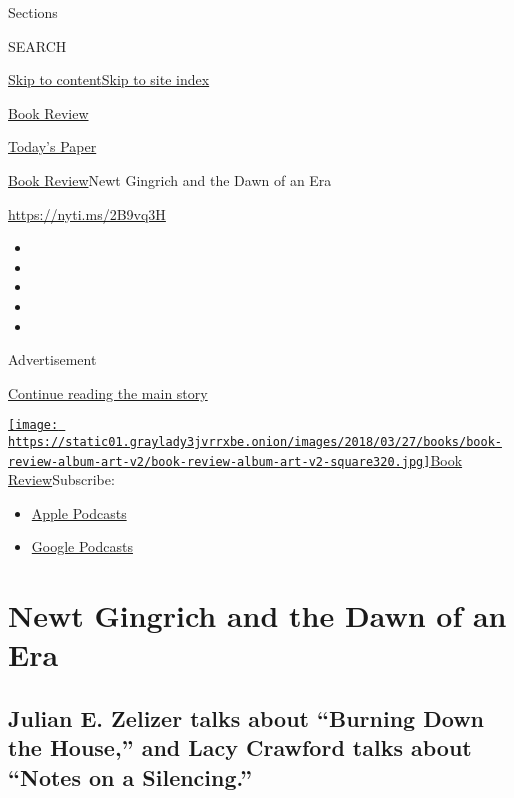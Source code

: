 Sections

SEARCH

\protect\hyperlink{site-content}{Skip to
content}\protect\hyperlink{site-index}{Skip to site index}

\href{https://www.nytimes3xbfgragh.onion/section/books/review}{Book
Review}

\href{https://myaccount.nytimes3xbfgragh.onion/auth/login?response_type=cookie\&client_id=vi}{}

\href{https://www.nytimes3xbfgragh.onion/section/todayspaper}{Today's
Paper}

\href{/section/books/review}{Book Review}\textbar{}Newt Gingrich and the
Dawn of an Era

\url{https://nyti.ms/2B9vq3H}

\begin{itemize}
\item
\item
\item
\item
\item
\end{itemize}

Advertisement

\protect\hyperlink{after-top}{Continue reading the main story}

\href{https://www.nytimes3xbfgragh.onion/column/book-review-podcast}{\texttt{[image: https://static01.graylady3jvrrxbe.onion/images/2018/03/27/books/book-review-album-art-v2/book-review-album-art-v2-square320.jpg]}Book
Review}Subscribe:

\begin{itemize}
\tightlist
\item
  \href{https://itunes.apple.com/us/podcast/id120315179}{Apple Podcasts}
\item
  \href{https://www.google.com/podcasts?feed=aHR0cHM6Ly9yc3MuYXJ0MTkuY29tL2Jvb2stcmV2aWV3}{Google
  Podcasts}
\end{itemize}

\hypertarget{newt-gingrich-and-the-dawn-of-an-era}{%
\section{Newt Gingrich and the Dawn of an
Era}\label{newt-gingrich-and-the-dawn-of-an-era}}

\hypertarget{julian-e-zelizer-talks-about-burning-down-the-house-and-lacy-crawford-talks-about-notes-on-a-silencing}{%
\subsection{Julian E. Zelizer talks about ``Burning Down the House,''
and Lacy Crawford talks about ``Notes on a
Silencing.''}\label{julian-e-zelizer-talks-about-burning-down-the-house-and-lacy-crawford-talks-about-notes-on-a-silencing}}

